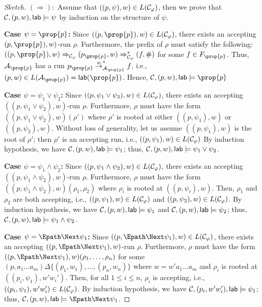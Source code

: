 \documentclass{llncs}
\newcommand{\inductioncase}[1]{\noindent\textbf{#1}}
\let\phi\varphi
\begin{document}
{{\begin{proof}[Sketch]
\noindent$(\Rightarrow):$ Assume that $((p,\psi),w) \in L(\CABPDS_{\phi})$, then we prove that $\mathcal{C},(p,w),\mathsf{lab} \models \psi$ by induction on the structure of $\psi$.

\inductioncase{Case $\psi = \prop{p}$:} Since $((p,\prop{p}),w) \in L(\CABPDS_{\phi})$, there exists an accepting 
$(p,\prop{p}),w)$-run $\rho$. Furthermore, the prefix of $\rho$ must  satisfy the following:
$((p,\prop{p}),w) \Rightarrow_{\CABPDS_\varphi} (p_\prop{p},w) \Rightarrow_{\CABPDS_\varphi}^* (f,\#)$ for some $f \in F_\prop{p}$.
Thus, $\AAut_\prop{p}$ has a run $p_\prop{p} \stackrel{w}{\rightarrow}^*_{\AAut_\prop{p}} f$, i.e., $(p,w) \in L(\AAut_\prop{p}) = \lab(\prop{p})$.
Hence, $\CABPDS,(p,w),\lab \models \prop{p}$

\inductioncase{Case $\psi = \psi_1\lor\psi_2$:}
Since $((p,\psi_1\lor\psi_2),w) \in L(\CABPDS_{\phi})$, there exists an accepting 
$((p,\psi_1\lor\psi_2),w)$-run $\rho$. Furthermore, $\rho$ must have the form
$((p,\psi_1\lor\psi_2),w)(\rho')$ where $\rho'$ is rooted at either
$((p,\psi_1),w)$ or $((p,\psi_2),w)$.  
Without loss of generality, let us assume $((p,\psi_1),w)$ is the root of $\rho'$;
then $\rho'$ is an accepting run, i.e., $((p,\psi_1),w) \in L(\CABPDS_{\phi})$
By induction hypothesis, we have $\mathcal{C},(p,w),\mathsf{lab} \models \psi_1$; thus,
$\mathcal{C},(p,w),\mathsf{lab} \models \psi_1 \lor \psi_2$.

\inductioncase{Case $\psi = \psi_1\land\psi_2$:}
Since $((p,\psi_1\land\psi_2),w) \in L(\CABPDS_{\phi})$, there exists an accepting 
$((p,\psi_1\land\psi_2),w)$-run $\rho$. Furthermore, $\rho$ must have the form
$((p,\psi_1\land\psi_2),w)(\rho_1,\rho_2)$ where $\rho_i$ is rooted at 
$((p,\psi_i),w)$.  
Then, $\rho_1$ and $\rho_2$ are both accepting, i.e., $((p,\psi_1),w) \in L(\CABPDS_{\phi})$
and $((p,\psi_2),w) \in L(\CABPDS_{\phi})$.
By induction hypothesis, we have $\mathcal{C},(p,w),\mathsf{lab} \models \psi_1$ and
$\mathcal{C},(p,w),\mathsf{lab} \models \psi_2$; thus,
$\mathcal{C},(p,w),\mathsf{lab} \models \psi_1 \land \psi_2$.

\inductioncase{Case $\psi = \Epath\Next\psi_1$:}
Since $((p,\Epath\Next\psi_1),w) \in L(\CABPDS_{\phi})$, there exists an accepting 
$((p,\Epath\Next\psi_1),\linebreak w)$-run $\rho$. Furthermore, $\rho$ must have the form
$((p,\Epath\Next\psi_1),w)(\rho_1,\ldots,\rho_n)$ for some
$(p,a_1\ldots a_m) \Delta \{(p_1,w_1),\ldots,(p_n,w_n)\}$
where  $w=w'a_1\ldots a_m$ 
and 
$\rho_i$ is rooted at 
$((p_i,\psi_1),w'w_i')$.  
Then, for all $1\leq i \leq n$, $\rho_i$ is accepting, i.e., $((p_i,\psi_1),w'w_i') \in L(\CABPDS_{\phi})$.
By induction hypothesis, we have $\mathcal{C},(p_i,w'w_i'),\mathsf{lab} \models \psi_1$; thus,
$\CABPDS,(p,w),\lab \models \Epath\Next\psi_1$.


\end{proof}}}
\end{document}
